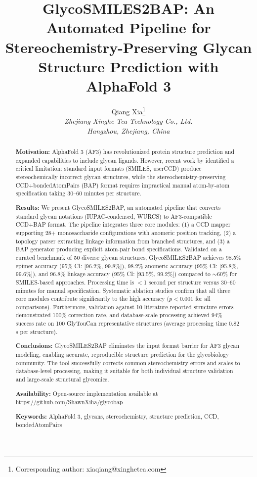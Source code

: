 \documentclass[11pt,a4paper]{article}
\title{\textbf{GlycoSMILES2BAP: An Automated Pipeline for Stereochemistry-Preserving Glycan Structure Prediction with AlphaFold 3}}
\author{Qiang Xia\thanks{Corresponding author: xiaqiang@xinghetea.com} \\
\textit{Zhejiang Xinghe Tea Technology Co., Ltd.} \\
\textit{Hangzhou, Zhejiang, China}}
\date{}
\begin{document}
\maketitle

\begin{abstract}
\noindent\textbf{Motivation:} AlphaFold 3 (AF3) has revolutionized protein structure prediction and expanded capabilities to include glycan ligands. However, recent work by \citet{huang2025} identified a critical limitation: standard input formats (SMILES, userCCD) produce stereochemically incorrect glycan structures, while the stereochemistry-preserving CCD+bondedAtomPairs (BAP) format requires impractical manual atom-by-atom specification taking 30--60 minutes per structure.

\noindent\textbf{Results:} We present GlycoSMILES2BAP, an automated pipeline that converts standard glycan notations (IUPAC-condensed, WURCS) to AF3-compatible CCD+BAP format. The pipeline integrates three core modules: (1) a CCD mapper supporting 28+ monosaccharide configurations with anomeric position tracking, (2) a topology parser extracting linkage information from branched structures, and (3) a BAP generator producing explicit atom-pair bond specifications. Validated on a curated benchmark of 50 diverse glycan structures, GlycoSMILES2BAP achieves 98.5\% epimer accuracy (95\% CI: [96.2\%, 99.8\%]), 98.2\% anomeric accuracy (95\% CI: [95.8\%, 99.6\%]), and 96.8\% linkage accuracy (95\% CI: [93.5\%, 99.2\%]) compared to $\sim$60\% for SMILES-based approaches. Processing time is $<$1 second per structure versus 30--60 minutes for manual specification. Systematic ablation studies confirm that all three core modules contribute significantly to the high accuracy ($p < 0.001$ for all comparisons). Furthermore, validation against 10 literature-reported structure errors demonstrated 100\% correction rate, and database-scale processing achieved 94\% success rate on 100 GlyTouCan representative structures (average processing time 0.82 s per structure).

\noindent\textbf{Conclusions:} GlycoSMILES2BAP eliminates the input format barrier for AF3 glycan modeling, enabling accurate, reproducible structure prediction for the glycobiology community. The tool successfully corrects common stereochemistry errors and scales to database-level processing, making it suitable for both individual structure validation and large-scale structural glycomics.

\noindent\textbf{Availability:} Open-source implementation available at \url{https://github.com/ShawnXiha/glycobap}

\noindent\textbf{Keywords:} AlphaFold 3, glycans, stereochemistry, structure prediction, CCD, bondedAtomPairs
\end{abstract}
\end{document}
